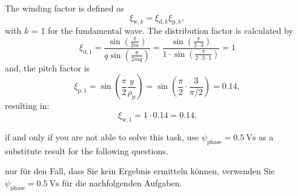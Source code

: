 
\begin{solutionblock}
    The winding factor is defined as
    $$
        \xi_{\mathrm{w},k} = \xi_{\mathrm{d},k} \xi_{\mathrm{p},k},
    $$
    with $k$ = 1 for the fundamental wave. The distribution factor is calculated by
    $$
        \xi_{\mathrm{d},1} = \frac{\sin\left(\frac{\pi}{2m}\right)}{q \sin\left(\frac{\pi}{2mq}\right)} = \frac{\sin\left(\frac{\pi}{2\cdot 3}\right)}{1\cdot \sin\left(\frac{\pi}{2\cdot 3\cdot 1}\right)} = 1
    $$
    and, the pitch factor is
    $$
        \xi_{\mathrm{p},1} = \sin\left(\frac{\pi}{2}\frac{y}{\rho_{\mathrm{p}}}\right) = \sin\left(\frac{\pi}{2} \cdot \frac{3}{\pi/2}\right) = 0.14,
    $$
    resulting in:
    $$
        \xi_{\mathrm{w},1} = 1 \cdot 0.14 = 0.14 .
    $$
\end{solutionblock}




\begin{hintblock}
    if and only if you are not able to solve this task, use $\psi_{\mathrm{phase}} = \SI{0.5}{\volt\second}$ as a substitute result for the following questions.
\end{hintblock}


\begin{germanhintblock}
    nur für den Fall, dass Sie kein Ergebnis ermitteln können, verwenden Sie $\psi_{\mathrm{phase}} = \SI{0.5}{\volt\second}$ für die nachfolgenden Aufgaben.
\end{germanhintblock}




